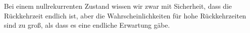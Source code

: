 Bei einem nullrekurrenten Zustand wissen wir zwar mit Sicherheit, dass die Rückkehrzeit endlich ist, aber die Wahrscheinlichkeiten für hohe Rückkehrzeiten sind zu groß, als dass es eine endliche Erwartung gäbe.